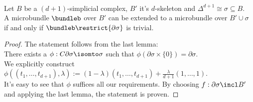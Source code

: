 \\ Let $B$ be a $(d + 1)$-simplicial complex, $B'$ it's $d$-skeleton and $\Delta^{d + 1} \cong \sigma \subseteq B$.
\\ A microbundle $\bundleb$ over $B'$ can be extended to a microbundle over $B' \cup \sigma$ if and only if $\bundleb \restrict{\partial \sigma}$ is trivial.
\begin{proof}
The statement follows from the last lemma:
\\ There exists a $\phi: C\partial \sigma \isomto \sigma$ such that $\phi(\partial \sigma \times \{0\}) = \partial \sigma$.
\\ We explicitly construct $\phi((t_1, \dots, t_{d + 1}), \lambda) := (1 - \lambda) (t_1, \dots, t_{d + 1}) + \frac{\lambda}{d + 1} (1, \dots, 1)$.
\\ It's easy to see that $\phi$ suffices all our requirements. By choosing $f: \partial \sigma \incl B'$ and applying the last lemma, the statement is proven.
\end{proof}